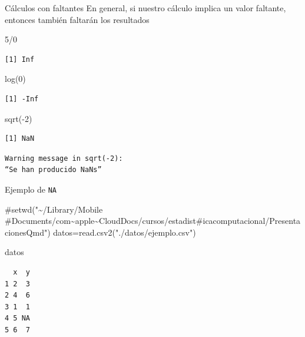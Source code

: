 \documentclass[
  ignorenonframetext,
  aspectratio=169,
  spanish,
]{beamer}
\newenvironment{Shaded}{\begin{snugshade}}{\end{snugshade}}
\newcommand{\CommentTok}[1]{\textcolor[rgb]{0.37,0.37,0.37}{#1}}
\newcommand{\DecValTok}[1]{\textcolor[rgb]{0.68,0.00,0.00}{#1}}
\newcommand{\FunctionTok}[1]{\textcolor[rgb]{0.28,0.35,0.67}{#1}}
\newcommand{\NormalTok}[1]{\textcolor[rgb]{0.00,0.23,0.31}{#1}}
\newcommand{\OtherTok}[1]{\textcolor[rgb]{0.00,0.23,0.31}{#1}}
\newcommand{\SpecialCharTok}[1]{\textcolor[rgb]{0.37,0.37,0.37}{#1}}
\newcommand{\StringTok}[1]{\textcolor[rgb]{0.13,0.47,0.30}{#1}}
\begin{document}
\begin{frame}[fragile]{Cálculos con faltantes}
\label{cuxe1lculos-con-faltantes}
En general, si nuestro cálculo implica un valor faltante, entonces
también faltarán los resultados

\begin{Shaded}
\begin{Highlighting}[]
\DecValTok{5}\SpecialCharTok{/}\DecValTok{0}
\end{Highlighting}
\end{Shaded}

\begin{verbatim}
[1] Inf
\end{verbatim}

\begin{Shaded}
\begin{Highlighting}[]
\FunctionTok{log}\NormalTok{(}\DecValTok{0}\NormalTok{)}
\end{Highlighting}
\end{Shaded}

\begin{verbatim}
[1] -Inf
\end{verbatim}

\begin{Shaded}
\begin{Highlighting}[]
\FunctionTok{sqrt}\NormalTok{(}\SpecialCharTok{{-}}\DecValTok{2}\NormalTok{)}
\end{Highlighting}
\end{Shaded}

\begin{verbatim}
[1] NaN
\end{verbatim}

\begin{verbatim}
Warning message in sqrt(-2):
“Se han producido NaNs”
\end{verbatim}
\end{frame}

\begin{frame}[fragile]{Ejemplo de \texttt{NA}}
\label{ejemplo-de-na}
\begin{Shaded}
\begin{Highlighting}[]
\CommentTok{\#setwd("\textasciitilde{}/Library/Mobile \#Documents/com\textasciitilde{}apple\textasciitilde{}CloudDocs/cursos/estadist\#icacomputacional/PresentacionesQmd") }
\NormalTok{datos}\OtherTok{=}\FunctionTok{read.csv2}\NormalTok{(}\StringTok{"./datos/ejemplo.csv"}\NormalTok{) }
\end{Highlighting}
\end{Shaded}

\begin{Shaded}
\begin{Highlighting}[]
\NormalTok{datos}
\end{Highlighting}
\end{Shaded}

\begin{verbatim}
  x  y
1 2  3
2 4  6
3 1  1
4 5 NA
5 6  7
\end{verbatim}
\end{frame}
\end{document}
